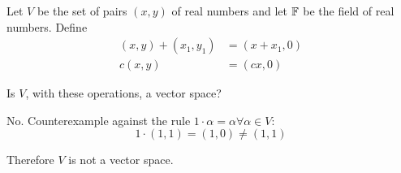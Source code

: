 \documentclass[a4paper, 11pt]{article}
\begin{document}
\begin{problem} 
Let \(V\) be the set of pairs \((x, y)\) of real numbers and let \(\mathbb{F}\) be the field of real numbers. Define
\begin{align*}
    (x, y) + (x_1, y_1) & = (x+x_1, 0) \\
    c(x, y)             & = (cx, 0)
\end{align*}

Is \(V\), with these operations, a vector space?
\end{problem}
\begin{solution}
    No. Counterexample against the rule \(1 \cdot \alpha = \alpha \forall \alpha \in V\):
    \[
        1\cdot(1,1) = (1, 0) \neq (1, 1)
    \]

    Therefore \(V\) is not a vector space.
\end{solution}
\end{document}

